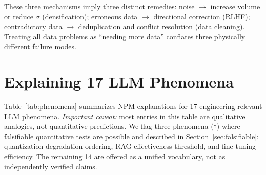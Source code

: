 \documentclass[11pt,a4paper]{article}
\begin{document}
\noindent These three mechanisms imply three distinct remedies:
noise $\to$ increase volume or reduce $\sigma$ (densification);
erroneous data $\to$ directional correction (RLHF);
contradictory data $\to$ deduplication and conflict resolution (data cleaning).
Treating all data problems as ``needing more data'' conflates three
physically different failure modes.

\section{Explaining 17 LLM Phenomena}

Table~\ref{tab:phenomena} summarizes NPM explanations for 17
engineering-relevant LLM phenomena.
\emph{Important caveat:} most entries in this table are qualitative analogies,
not quantitative predictions. We flag three phenomena ($\dagger$) where
falsifiable quantitative tests are possible and described in
Section~\ref{sec:falsifiable}: quantization degradation ordering,
RAG effectiveness threshold, and fine-tuning efficiency.
The remaining 14 are offered as a unified vocabulary, not as
independently verified claims.
\end{document}

